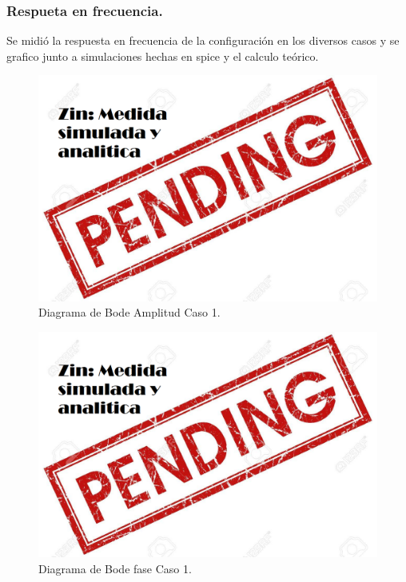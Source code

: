 \subsubsection{Respueta en frecuencia.}
Se midió la respuesta en frecuencia de la configuración en los diversos casos y se grafico junto a simulaciones hechas en spice y el calculo teórico.
\begin{figure}[H]	
	\centering
	\includegraphics[width=\textwidth]{Ejercicio1/Imagenes/BodeC1.png}
	\caption{Diagrama de Bode Amplitud Caso 1.}
	\label{fig:BodeC1}
\end{figure} 
\begin{figure}[H]	
	\centering
	\includegraphics[width=\textwidth]{Ejercicio1/Imagenes/BodephC1.png}
	\caption{Diagrama de Bode fase Caso 1.}
	\label{fig:BodephC1}
\end{figure} 
